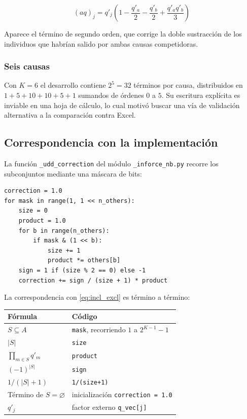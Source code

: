 \documentclass[a4paper, 12pt]{article}
\begin{document}
\begin{equation}
(aq)_j = q'_j \left(1 - \frac{q'_a}{2} - \frac{q'_b}{2} + \frac{q'_a q'_b}{3}\right)
\end{equation}

Aparece el término de segundo orden, que corrige la doble sustracción de los individuos que habrían salido por ambas causas competidoras.

\subsubsection*{Seis causas}

Con $K=6$ el desarrollo contiene $2^5 = 32$ términos por causa, distribuidos en $1 + 5 + 10 + 10 + 5 + 1$ sumandos de órdenes $0$ a $5$. Su escritura explícita es inviable en una hoja de cálculo, lo cual motivó buscar una vía de validación alternativa a la comparación contra Excel.

\subsection{Correspondencia con la implementación}

La función \texttt{\_udd\_correction} del módulo \texttt{\_inforce\_nb.py} recorre los subconjuntos mediante una máscara de bits:

\begin{verbatim}
correction = 1.0
for mask in range(1, 1 << n_others):
    size = 0
    product = 1.0
    for b in range(n_others):
        if mask & (1 << b):
            size += 1
            product *= others[b]
    sign = 1 if (size % 2 == 0) else -1
    correction += sign / (size + 1) * product
\end{verbatim}

La correspondencia con \eqref{eq:incl_excl} es término a término:

\begin{center}
\begin{tabular}{ll}
\toprule
\textbf{Fórmula} & \textbf{Código} \\
\midrule
$S \subseteq A$ & \texttt{mask}, recorriendo $1$ a $2^{K-1}-1$ \\
$|S|$ & \texttt{size} \\
$\prod_{m\in S} q'_m$ & \texttt{product} \\
$(-1)^{|S|}$ & \texttt{sign} \\
$1/(|S|+1)$ & \texttt{1/(size+1)} \\
Término de $S=\varnothing$ & inicialización \texttt{correction = 1.0} \\
$q'_j$ & factor externo \texttt{q\_vec[j]} \\
\bottomrule
\end{tabular}
\end{center}
\end{document}

